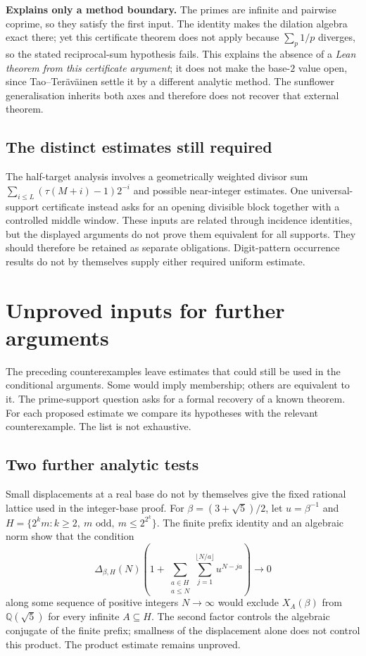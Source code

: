 \documentclass[11pt]{article}
\theoremstyle{plain}
\theoremstyle{definition}
\theoremstyle{remark}
\newcommand{\lean}[2]{\leanlink{#2}}
\newcommand{\Q}{\mathbb{Q}}
\begin{document}
\textbf{Explains only a method boundary.} The primes are infinite and pairwise coprime, so they satisfy the
first input.  The identity
\lean{compositeDilationDefect\_eq\_zero\_of\_prime\_support}{CompositeDilationDefect.lean:103} makes
the dilation algebra exact there; yet this certificate theorem does not
apply because $\sum_p1/p$ diverges, so the stated reciprocal-sum
hypothesis fails.  This explains
the absence of a \emph{Lean theorem from this certificate argument}; it does not make the
base-$2$ value open, since Tao--Ter\"av\"ainen settle it by a different
analytic method.  The sunflower generalisation inherits both axes and
therefore does not recover that external theorem.

\subsection{The distinct estimates still required}

The half-target analysis involves a geometrically weighted divisor sum
$\sum_{i\le L}(\tau(M+i)-1)2^{-i}$ and possible near-integer estimates.
One universal-support certificate instead asks for an opening divisible
block together with a controlled middle window.  These inputs are related
through incidence identities, but the displayed arguments do not prove
them equivalent for all supports.  They should therefore be retained as
separate obligations.  Digit-pattern occurrence results do not by
themselves supply either required uniform estimate.

\section{Unproved inputs for further arguments}
\label{sec:257-survivors}
The preceding counterexamples leave estimates that could still be used
in the conditional arguments. Some would imply membership; others are
equivalent to it. The prime-support question asks for a formal recovery
of a known theorem. For each proposed estimate we compare its
hypotheses with the relevant counterexample. The list is not exhaustive.

\subsection*{Two further analytic tests}
Small displacements at a real base do not by themselves give the fixed
rational lattice used in the integer-base proof.  For
$\beta=(3+\sqrt5)/2$, let $u=\beta^{-1}$ and
$H=\{2^km:k\ge2,\ m\text{ odd},\ m\le2^{2^k}\}$.
The finite prefix identity and an algebraic norm show that the condition
\[
 \Delta_{\beta,H}(N)
 \left(1+\sum_{\substack{a\in H\\a\le N}}
                 \sum_{j=1}^{\lfloor N/a\rfloor}u^{N-ja}\right)
 \longrightarrow0
\]
along some sequence of positive integers $N\to\infty$ would exclude $X_A(\beta)$ from $\Q(\sqrt5)$ for every
infinite $A\subseteq H$.  The second factor controls the algebraic
conjugate of the finite prefix; smallness of the displacement alone does
not control this product.  The product estimate remains unproved.
\end{document}

